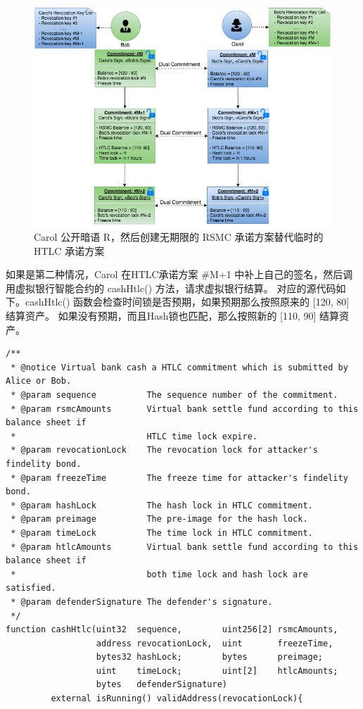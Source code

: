 \begin{appendices}
\begin{figure}[h!]
    \centering
    \includegraphics[width=12cm, keepaspectratio]{../images/bob_carol_3.png}
    \caption{Carol 公开暗语 R，然后创建无期限的 RSMC 承诺方案替代临时的 HTLC 承诺方案}
    \label{fig:A_bob_carol_3}
\end{figure}

如果是第二种情况，Carol 在HTLC承诺方案 \#M+1 中补上自己的签名，然后调用虚拟银行智能合约的 cashHtlc() 方法，请求虚拟银行结算。
对应的源代码如下。cashHtlc() 函数会检查时间锁是否预期，如果预期那么按照原来的 [120, 80] 结算资产。
如果没有预期，而且Hash锁也匹配，那么按照新的 [110, 90] 结算资产。

\begin{lstlisting}[caption={兑现HTLC共同承诺}, label={lst:cashHtlc}]
/**
 * @notice Virtual bank cash a HTLC commitment which is submitted by Alice or Bob.
 * @param sequence          The sequence number of the commitment.
 * @param rsmcAmounts       Virtual bank settle fund according to this balance sheet if 
 *                          HTLC time lock expire.
 * @param revocationLock    The revocation lock for attacker's findelity bond.
 * @param freezeTime        The freeze time for attacker's findelity bond.
 * @param hashLock          The hash lock in HTLC commitment.
 * @param preimage          The pre-image for the hash lock.
 * @param timeLock          The time lock in HTLC commitment.
 * @param htlcAmounts       Virtual bank settle fund according to this balance sheet if 
 *                          both time lock and hash lock are satisfied.
 * @param defenderSignature The defender's signature.
 */
function cashHtlc(uint32  sequence,        uint256[2] rsmcAmounts, 
                  address revocationLock,  uint       freezeTime, 
                  bytes32 hashLock;        bytes      preimage;
                  uint    timeLock;        uint[2]    htlcAmounts;
                  bytes   defenderSignature) 
         external isRunning() validAddress(revocationLock){


\end{lstlisting}
\end{appendices}
